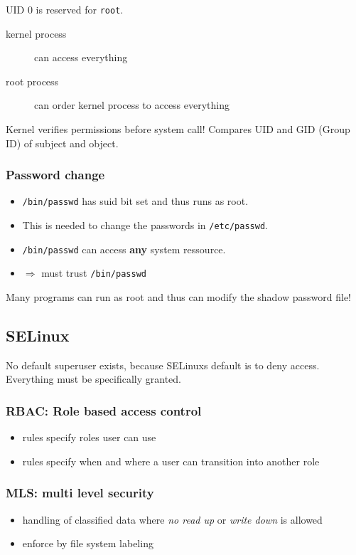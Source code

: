 UID 0 is reserved for \texttt{root}.
\begin{description}
    \item[kernel process] can access everything
    \item[root process] can order kernel process to access everything
\end{description}

Kernel verifies permissions before system call! Compares UID and GID (Group ID) of subject and object.

\subsubsection{Password change}
\begin{itemize}
  \item \texttt{/bin/passwd} has suid bit set and thus runs as root.
  \item This is needed to change the passwords in \texttt{/etc/passwd}.
  \item \texttt{/bin/passwd} can access \textbf{any} system ressource.
  \item $\Rightarrow$ must trust \texttt{/bin/passwd}
\end{itemize}
Many programs can run as root and thus can modify the
shadow password file!


\subsection{SELinux}
No default superuser exists, because SELinuxs default is to deny access. Everything must be specifically granted.

\subsubsection{RBAC: Role based access control}
\begin{itemize}
  \item rules specify roles user can use
  \item rules specify when and where a user can transition into another role
\end{itemize}

\subsubsection{MLS:  multi level security}
\begin{itemize}
  \item handling of classified data where \textit{no read up} or \textit{write down} is allowed
  \item enforce by file system labeling
\end{itemize}

